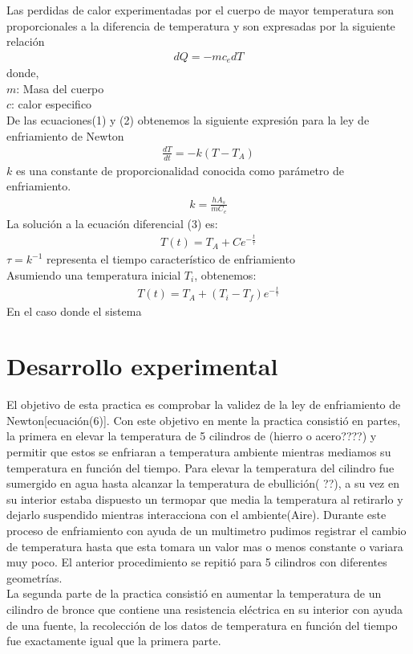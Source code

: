\documentclass{article}
\begin{document}
Las perdidas de calor experimentadas por el cuerpo de mayor temperatura son proporcionales a la diferencia de temperatura y son expresadas por la siguiente relación 
\begin{align}
    dQ = -mc_edT
\end{align}
donde, \\ 
$m$: Masa del cuerpo \\ 
$c$: calor especifico \\ 
De las ecuaciones(1) y (2) obtenemos la siguiente expresión para la ley de enfriamiento de Newton 
\begin{align}
    \frac{dT}{dt} = -k(T-T_A)
\end{align}
$k$ es una constante de proporcionalidad conocida como parámetro de enfriamiento. 
\begin{align}
    k = \frac{hA_s}{mC_e}
\end{align}
La solución a la ecuación diferencial (3) es: 
\begin{align}
    T(t) = T_A + Ce^{-\frac{t}{\tau}}
\end{align}
$\tau = k^{-1}$ representa el tiempo característico de enfriamiento \\ 
Asumiendo una temperatura inicial $T_i$, obtenemos: 
\begin{align}
    T(t) = T_A + (T_i-T_f)e^{-\frac{t}{\tau}}
\end{align}
En el caso donde el sistema 

\section{Desarrollo experimental}
El objetivo de esta practica es comprobar la validez de la ley de enfriamiento de Newton[ecuación(6)]. Con este objetivo en mente la practica consistió en partes, la primera en elevar la temperatura de 5 cilindros de (hierro o acero????)  y permitir que estos se enfriaran a temperatura ambiente mientras mediamos su temperatura en función del tiempo. 
Para elevar la temperatura del cilindro fue sumergido en agua hasta alcanzar la temperatura de ebullición( ??), a su vez en su interior estaba dispuesto un termopar que media la temperatura al retirarlo y dejarlo suspendido mientras interacciona con el ambiente(Aire). Durante este proceso de enfriamiento con ayuda de un multimetro pudimos registrar el cambio de temperatura hasta que esta tomara un valor mas o menos constante o variara muy poco. El anterior procedimiento se repitió para 5 cilindros con diferentes geometrías.  \\ 
La segunda parte de la practica consistió en aumentar la temperatura de un cilindro de bronce que contiene una resistencia eléctrica en su interior con ayuda de una fuente, la recolección de los datos de temperatura en función del tiempo fue exactamente igual que la primera parte.
\end{document}
